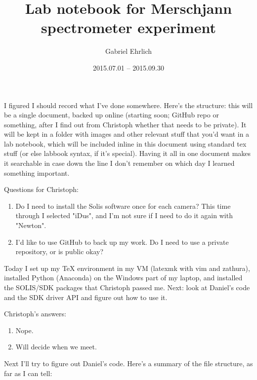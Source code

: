 \documentclass[11pt]{labbook}
\begin{document}
\title{Lab notebook for Merschjann spectrometer experiment}
\author{Gabriel Ehrlich}
\date{2015.07.01 -- 2015.09.30}
\maketitle

\tableofcontents


I figured I should record what I've done somewhere. Here's the structure: this will be a single document, backed up online (starting soon; GitHub repo or something, after I find out from Christoph whether that needs to be private). It will be kept in a folder with images and other relevant stuff that you'd want in a lab notebook, which will be included inline in this document using standard tex stuff (or else labbook syntax, if it's special). Having it all in one document makes it searchable in case down the line I don't remember on which day I learned something important.

Questions for Christoph:
\begin{enumerate}
\item Do I need to install the Solis software once for each camera? This time through I selected "iDus", and I'm not sure if I need to do it again with "Newton".
\item I'd like to use GitHub to back up my work. Do I need to use a private repository, or is public okay?

\end{enumerate}


Today I set up my TeX environment in my VM (latexmk with vim and zathura), installed Python (Anaconda) on the Windows part of my laptop, and installed the SOLIS/SDK packages that Christoph passed me. Next: look at Daniel's code and the SDK driver API and figure out how to use it.



Christoph's answers:

\begin{enumerate}
\item Nope.
\item Will decide when we meet.
\end{enumerate}

Next I'll try to figure out Daniel's code. Here's a summary of the file structure, as far as I can tell:
\end{document}
